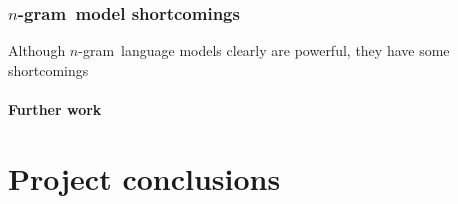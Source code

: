 \documentclass[a4paper,11pt]{kth-mag}
\newcommand{\ngram}{$n$-gram}
\begin{document}



\subsection{\ngram~model shortcomings}
Although \ngram~language models clearly are powerful, they have some shortcomings



\subsubsection{Further work}













\chapter{Project conclusions}
\end{document}
